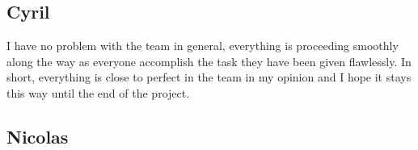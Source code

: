 \subsection{Cyril}

I have no problem with the team in general, everything is proceeding
smoothly along the way as everyone accomplish the task they have been given
flawlessly. In short, everything is close to perfect in the team in my
opinion and I hope it stays this way until the end of the project.
\subsection{Nicolas}
